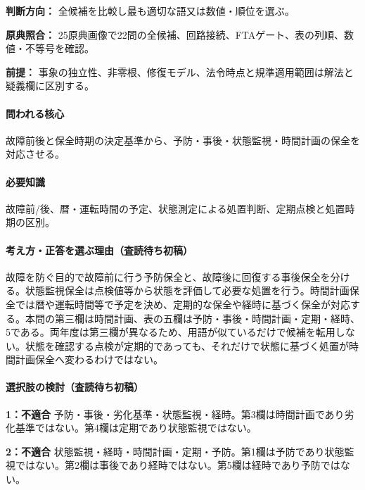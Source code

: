 \noindent\textbf{判断方向：} 全候補を比較し最も適切な語又は数値・順位を選ぶ。\par

\noindent\textbf{原典照合：} 25原典画像で22問の全候補、回路接続、FTAゲート、表の列順、数値・不等号を確認。\par

\noindent\textbf{前提：} 事象の独立性、非零根、修復モデル、法令時点と規準適用範囲は解法と疑義欄に区別する。\par

\paragraph{問われる核心} 故障前後と保全時期の決定基準から、予防・事後・状態監視・時間計画の保全を対応させる。

\paragraph{必要知識} 故障前/後、暦・運転時間の予定、状態測定による処置判断、定期点検と処置時期の区別。

\paragraph{考え方・正答を選ぶ理由（査読待ち初稿）} 故障を防ぐ目的で故障前に行う予防保全と、故障後に回復する事後保全を分ける。状態監視保全は点検値等から状態を評価して必要な処置を行う。時間計画保全では暦や運転時間等で予定を決め、定期的な保全や経時に基づく保全が対応する。本問の第三欄は時間計画、表の五欄は予防・事後・時間計画・定期・経時、5である。両年度は第三欄が異なるため、用語が似ているだけで候補を転用しない。状態を確認する点検が定期的であっても、それだけで状態に基づく処置が時間計画保全へ変わるわけではない。

\paragraph{選択肢の検討（査読待ち初稿）}\mbox{}\par

\noindent\textbf{1：不適合} 予防・事後・劣化基準・状態監視・経時。第3欄は時間計画であり劣化基準ではない。第4欄は定期であり状態監視ではない。\par

\noindent\textbf{2：不適合} 状態監視・経時・時間計画・定期・予防。第1欄は予防であり状態監視ではない。第2欄は事後であり経時ではない。第5欄は経時であり予防ではない。\par

